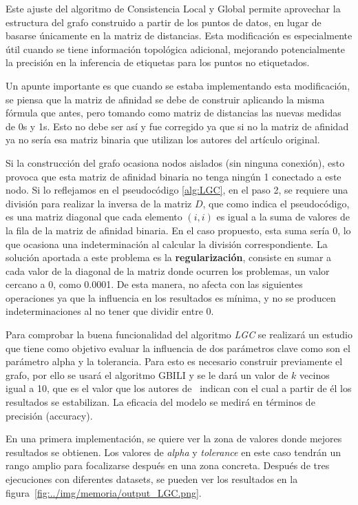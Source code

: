 Este ajuste del algoritmo de Consistencia Local y Global permite aprovechar la estructura del grafo construido a partir de los puntos de datos, en lugar de basarse únicamente en la matriz de distancias. Esta modificación es especialmente útil cuando se tiene información topológica adicional, mejorando potencialmente la precisión en la inferencia de etiquetas para los puntos no etiquetados.

Un apunte importante es que cuando se estaba implementando esta modificación, se piensa que la matriz de afinidad se debe de construir aplicando la misma fórmula que antes, pero tomando como matriz de distancias las nuevas medidas de 0s y 1s. Esto no debe ser así y fue corregido ya que si no la matriz de afinidad ya no sería esa matriz binaria que utilizan los autores del artículo original.

Si la construcción del grafo ocasiona nodos aislados (sin ninguna conexión), esto provoca que esta matriz de afinidad binaria no tenga ningún 1 conectado a este nodo. Si lo reflejamos en el pseudocódigo \ref{alg:LGC}, en el paso 2, se requiere una división para realizar la inversa de la matriz $D$, que como indica el pseudocódigo, es una matriz diagonal que cada elemento $(i, i)$ es igual a la suma de valores de la fila de la matriz de afinidad binaria. En el caso propuesto, esta suma sería 0, lo que ocasiona una indeterminación al calcular la división correspondiente. La solución aportada a este problema es la \textbf{regularización}, consiste en sumar a cada valor de la diagonal de la matriz donde ocurren los problemas, un valor cercano a 0, como 0.0001. De esta manera, no afecta con las siguientes operaciones ya que la influencia en los resultados es mínima, y no se producen indeterminaciones al no tener que dividir entre 0.

Para comprobar la buena funcionalidad del algoritmo \textit{LGC} se realizará un estudio que tiene como objetivo evaluar la influencia de dos parámetros clave como son el parámetro alpha y la tolerancia. Para esto es necesario construir previamente el grafo, por ello se usará el algoritmo GBILI y se le dará un valor de $k$ vecinos igual a 10, que es el valor que los autores de~\cite{gbili} indican con el cual a partir de él los resultados se estabilizan. La eficacia del modelo se medirá en términos de precisión (accuracy).

En una primera implementación, se quiere ver la zona de valores donde mejores resultados se obtienen. Los valores de \textit{alpha} y \textit{tolerance} en este caso tendrán un rango amplio para focalizarse después en una zona concreta. Después de tres ejecuciones con diferentes datasets, se pueden ver los resultados en la figura~\ref{fig:../img/memoria/output_LGC.png}.

